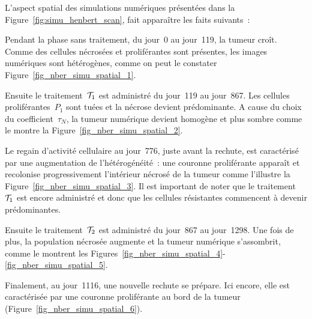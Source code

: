 \documentclass[main.tex]{subfiles}
\begin{document}
L'aspect spatial des simulations numériques présentées dans la Figure~\ref{fig:simu_henbert_scan}, fait apparaître les faits suivants~:
\begin{myenumerate}[label=\roman*)]
\item \label{ini} Pendant la phase sans traitement, du jour~0
    au jour~119, la tumeur croît. Comme des cellules nécrosées et proliférantes sont présentes, les images numériques sont hétérogènes, comme on peut le constater Figure~\ref{fig_nber_simu_spatial_1}.
\item \label{TI} Ensuite le traitement~${\mathcal T_1}$ est administré du jour~119 au jour~867.
 Les cellules proliférantes~$P_1$ sont tuées et la nécrose devient prédominante. A cause du choix du coefficient~$\tau_N$, la tumeur numérique devient homogène et plus sombre comme le montre la Figure~\ref{fig_nber_simu_spatial_2}.
\item \label{failureTI} Le regain d'activité cellulaire au jour~776, juste avant la rechute, est caractérisé par une augmentation de l'hétérogénéité~: une couronne proliférante apparaît et recolonise progressivement l'intérieur nécrosé de la tumeur comme l'illustre la  Figure~\ref{fig_nber_simu_spatial_3}. Il est important de noter que le traitement~${\mathcal T_1}$ est encore administré et donc que les cellules résistantes commencent à devenir prédominantes.
\item \label{TS} Ensuite le traitement~${\mathcal T_2}$ est administré du jour~867 au jour~1298. Une fois de plus, la population nécrosée augmente et la tumeur numérique s'assombrit, comme le montrent les Figures~\ref{fig_nber_simu_spatial_4}-\ref{fig_nber_simu_spatial_5}.
\item \label{last} Finalement, au jour~1116, une nouvelle rechute se prépare. Ici encore, elle est caractérisée par une couronne proliférante au bord de la tumeur (\cf  Figure~\ref{fig_nber_simu_spatial_6}).
\end{myenumerate}
\end{document}
